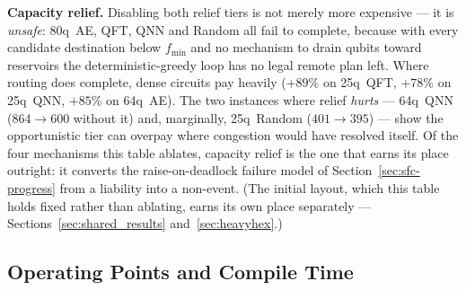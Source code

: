 \textbf{Capacity relief.} Disabling both relief tiers is not merely
more expensive --- it is \emph{unsafe}: 80q~AE, QFT, QNN and Random all
fail to complete, because with every candidate destination below
$f_\mathrm{min}$ and no mechanism to drain qubits toward reservoirs the
deterministic-greedy loop has no legal remote plan left. Where routing
does complete, dense circuits pay heavily ($+89\%$ on 25q~QFT, $+78\%$
on 25q~QNN, $+85\%$ on 64q~AE). The two instances where relief
\emph{hurts} --- 64q~QNN ($864 \to 600$ without it) and, marginally,
25q~Random ($401 \to 395$) --- show the opportunistic tier can overpay
where congestion would have resolved itself. Of the four mechanisms this table
ablates, capacity relief is the one that earns its place outright: it
converts the raise-on-deadlock failure model of
Section~\ref{sec:sfc-progress} from a liability into a non-event. (The
initial layout, which this table holds fixed rather than ablating,
earns its own place separately --- Sections~\ref{sec:shared_results}
and~\ref{sec:heavyhex}.)

\subsection{Operating Points and Compile Time}
\label{sec:layoutsearch}
\label{sec:time}

\begin{table}[t]
\centering
\caption{Protocol trade-off over all 24 instances. ``routes'' is the number of
  routing passes; times are complete compile costs (geometric mean per
  instance). \PORTER{} routes each of three candidate lookahead
  horizons and keeps the best (Section~\ref{sec:horizon}); \PORTER{}+R adds backward
  refinement (Section~\ref{sec:sfc-refine}) at a fixed horizon;
  \PORTER{}+S adds the best-of-$\gamma$ layout search of this section
  on top of it; \PORTER{}+SR takes the better of horizon selection and
  that search, netting the one route they share. All are seed-free.}
\label{tab:protocols}
\small
{}
\end{table}


